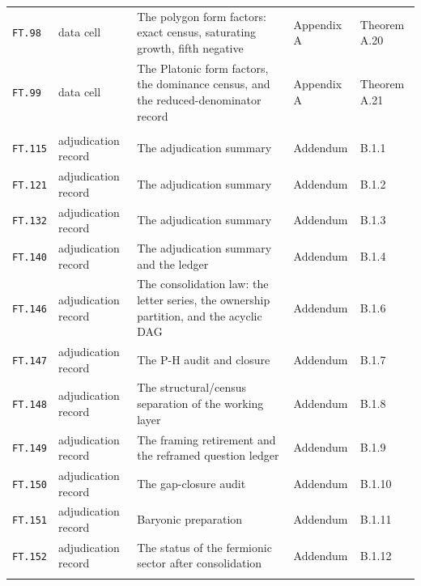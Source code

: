 \begin{longtable}{@{}p{}p{}p{}p{}p{}@{}}
\texttt{FT{.}98} & data cell & The polygon form factors: exact census, saturating growth, fifth negative & Appendix A & Theorem A.20 \\
\texttt{FT{.}99} & data cell & The Platonic form factors, the dominance census, and the reduced-denominator record & Appendix A & Theorem A.21 \\
\addlinespace[4pt]
\multicolumn{5}{@{}l}{\textbf{Addendum B.1 · the adjudication record (HistLog §IV)}}\\[2pt]
\texttt{FT{.}115} & adjudication record & The adjudication summary & Addendum & B.1.1 \\
\texttt{FT{.}121} & adjudication record & The adjudication summary & Addendum & B.1.2 \\
\texttt{FT{.}132} & adjudication record & The adjudication summary & Addendum & B.1.3 \\
\texttt{FT{.}140} & adjudication record & The adjudication summary and the ledger & Addendum & B.1.4 \\
\texttt{FT{.}146} & adjudication record & The consolidation law: the letter series, the ownership partition, and the acyclic DAG & Addendum & B.1.6 \\
\texttt{FT{.}147} & adjudication record & The P-H audit and closure & Addendum & B.1.7 \\
\texttt{FT{.}148} & adjudication record & The structural/census separation of the working layer & Addendum & B.1.8 \\
\texttt{FT{.}149} & adjudication record & The framing retirement and the reframed question ledger & Addendum & B.1.9 \\
\texttt{FT{.}150} & adjudication record & The gap-closure audit & Addendum & B.1.10 \\
\texttt{FT{.}151} & adjudication record & Baryonic preparation & Addendum & B.1.11 \\
\texttt{FT{.}152} & adjudication record & The status of the fermionic sector after consolidation & Addendum & B.1.12 \\
\addlinespace[4pt]
\bottomrule
\end{longtable}
\endgroup

